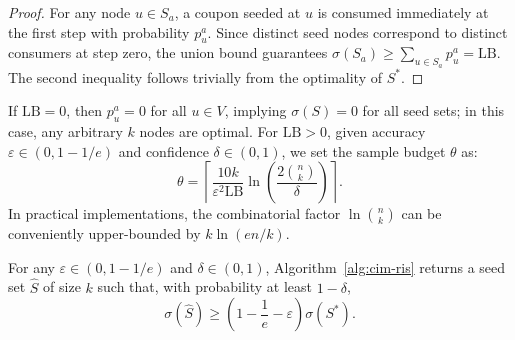\documentclass[sigconf]{acmart}
\begin{document}
\begin{proof}
For any node $u \in S_a$, a coupon seeded at $u$ is consumed immediately at the
first step with probability $p_u^a$.
Since distinct seed nodes correspond to distinct consumers at step zero, the
union bound guarantees $\sigma(S_a) \ge \sum_{u\in S_a} p_u^a = \mathrm{LB}$.
The second inequality follows trivially from the optimality of $S^*$.
\end{proof}

If $\mathrm{LB} = 0$, then $p_u^a = 0$ for all $u \in V$, implying $\sigma(S) = 0$
for all seed sets; in this case, any arbitrary $k$ nodes are optimal.
For $\mathrm{LB} > 0$, given accuracy $\varepsilon \in (0, 1 - 1/e)$ and confidence
$\delta \in (0,1)$, we set the sample budget $\theta$ as:
\begin{equation}
\label{eq:sample-budget}
  \theta = \left\lceil
    \frac{10k}{\varepsilon^2\mathrm{LB}}
    \ln\!\left(\frac{2\binom{n}{k}}{\delta}\right)
  \right\rceil.
\end{equation}
In practical implementations, the combinatorial factor $\ln\binom{n}{k}$ can be
conveniently upper-bounded by $k\ln(en/k)$.

\begin{theorem}
\label{thm:approx}
For any $\varepsilon \in (0, 1-1/e)$ and $\delta \in (0,1)$,
Algorithm~\ref{alg:cim-ris} returns a seed set $\hat{S}$ of size $k$ such that,
with probability at least $1-\delta$,
\begin{equation}
\label{eq:approx-bound}
  \sigma(\hat{S}) \ge \left(1 - \frac{1}{e} - \varepsilon\right) \sigma(S^*).
\end{equation}
\end{theorem}
\end{document}
